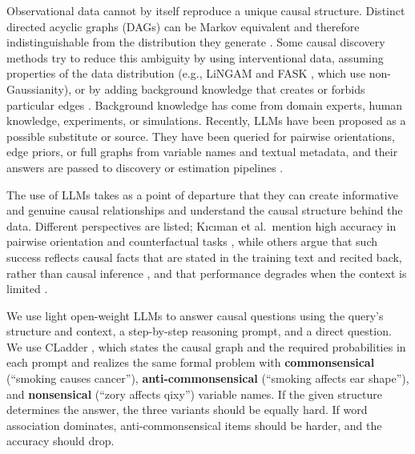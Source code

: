 \documentclass{llncs}
\begin{document}
Observational data cannot by itself reproduce a unique causal structure. Distinct directed acyclic graphs (DAGs) can be Markov equivalent and therefore indistinguishable from the distribution they generate \cite{verma1990equivalence,spirtes2000causation,glymour2019review}. Some causal discovery methods try to reduce this ambiguity by using interventional data, assuming properties of the data distribution (e.g., LiNGAM \cite{shimizu2006linear} and FASK \cite{sanchez2019estimating}, which use non-Gaussianity), or by adding background knowledge that creates or forbids particular edges \cite{spirtes2016causal}. Background knowledge has come from domain experts, human knowledge, experiments, or simulations. Recently, LLMs have been proposed as a possible substitute or source. They have been queried for pairwise orientations, edge priors, or full graphs from variable names and textual metadata, and their answers are passed to discovery or estimation pipelines \cite{long2023can,kiciman2023causal,zhang2023understanding,verma2025causal}.

The use of LLMs takes as a point of departure that they can create informative and genuine causal relationships and 
understand the causal structure behind the data. Different perspectives are listed;  Kıcıman et al.\ 
mention high accuracy in pairwise orientation and counterfactual tasks \cite{kiciman2023causal}, while others argue that such success reflects causal facts that are stated in the training text and recited back, rather than causal inference \cite{willig2022can, Zecevic2023CausalPL}, and that performance degrades when the context is limited \cite{hobbhahn2022investigating,li2023counterfactual,chen2024clear}.

We use light open-weight LLMs to answer causal questions using the query's structure and context, a step-by-step reasoning prompt, and a direct question. We use CLadder \cite{jin2023cladder}, which states the causal graph and the required probabilities in each prompt and realizes the same formal problem with \textbf{\textcolor{cComm}{commonsensical}} (``smoking causes cancer''), \textbf{\textcolor{cAnti}{anti-commonsensical}} (``smoking affects ear shape''), and \textbf{\textcolor{cNons}{nonsensical}} (``zory affects qixy'') variable names. If the given structure determines the answer, the three variants should be equally hard. If word association dominates, anti-commonsensical items should be harder, and the accuracy should drop.
\end{document}
